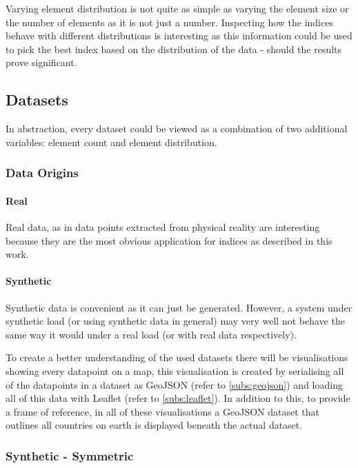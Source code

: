 Varying element distribution is not quite as simple as varying the element size or the number of elements as it is not just a number. Inspecting how the indices behave with different distributions is interesting as this information could be used to pick the best index based on the distribution of the data - should the results prove significant.


\subsection{Datasets}

In abstraction, every dataset could be viewed as a combination of two additional variables: element count and element distribution.

\subsubsection{Data Origins}

\paragraph{Real} Real data, as in data points extracted from physical reality are interesting because they are the most obvious application for indices as described in this work.

\paragraph{Synthetic} Synthetic data is convenient as it can just be generated. However, a system under synthetic load (or using synthetic data in general) may very well not behave the same way it would under a real load (or with real data respectively).

To create a better understanding of the used datasets there will be visualisations showing every datapoint on a map, this visualisation is created by serialising all of the datapoints in a dataset as GeoJSON (refer to \autoref{subs:geojson}) and loading all of this data with Leaflet (refer to \autoref{subs:leaflet}). In addition to this, to provide a frame of reference, in all of these visualisations a GeoJSON dataset\cite{countryjson} that outlines all countries on earth is displayed beneath the actual dataset.

\subsubsection{Synthetic - Symmetric}

